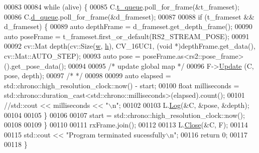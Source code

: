 \begin{DoxyCode}
00083 
00084     \textcolor{keywordflow}{while} (alive) \{
00085         C.\hyperlink{classCamera_ad8a4c52c0ae125ab8ca66902408f5e95}{t\_queue}.poll\_for\_frame(&t\_frameset);
00086         C.\hyperlink{classCamera_a84a3a043e61b967fb1dc6fbe62bf33aa}{d\_queue}.poll\_for\_frame(&d\_frameset);
00087 
00088         \textcolor{keywordflow}{if} (t\_frameset && d\_frameset) \{
00089             \textcolor{keyword}{auto} depthFrame = d\_frameset.get\_depth\_frame();
00090             \textcolor{keyword}{auto} poseFrame  = t\_frameset.first\_or\_default(RS2\_STREAM\_POSE);
00091 
00092             cv::Mat depth(cv::Size(\hyperlink{Camera_8hpp_a66326676d44c838441a4dc39c85f599b}{w}, \hyperlink{Camera_8hpp_a3f40fea9b1040e381f08ddd4b026765d}{h}), CV\_16UC1, (\textcolor{keywordtype}{void} *)depthFrame.get\_data(), cv::Mat::AUTO\_STEP);
00093             \textcolor{keyword}{auto} pose = poseFrame.as<rs2::pose\_frame>().get\_pose\_data();
00094 
00095             \textcolor{comment}{/* update global map */}
00096             F->\hyperlink{classMap__FE_a901af5011ef87bfd1dac3e568ef29c47}{Update} (C, pose, depth);
00097             \textcolor{comment}{/*                   */}
00098 
00099             \textcolor{keyword}{auto} elapsed = std::chrono::high\_resolution\_clock::now() - start;
00100             \textcolor{keywordtype}{float} milliseconds = std::chrono::duration\_cast<std::chrono::milliseconds>(elapsed).count();
00101             \textcolor{comment}{//std::cout << milliseconds << "\(\backslash\)n";}
00102 
00103             L.\hyperlink{classLogger_adcc95257ff2edceded8e272dac3603ce}{Log}(&C, &pose, &depth);
00104 
00105         \}
00106 
00107         start = std::chrono::high\_resolution\_clock::now();
00108 
00109     \}
00110 
00111     rxFrame.join();
00112 
00113     L.\hyperlink{classLogger_a6b670ceb54a249eb83da08a1914d2be8}{Close}(&C, F);
00114 
00115     std::cout << \textcolor{stringliteral}{"Program terminated sucessfully\(\backslash\)n"};
00116     \textcolor{keywordflow}{return} 0;
00117     
00118 \}
\end{DoxyCode}
